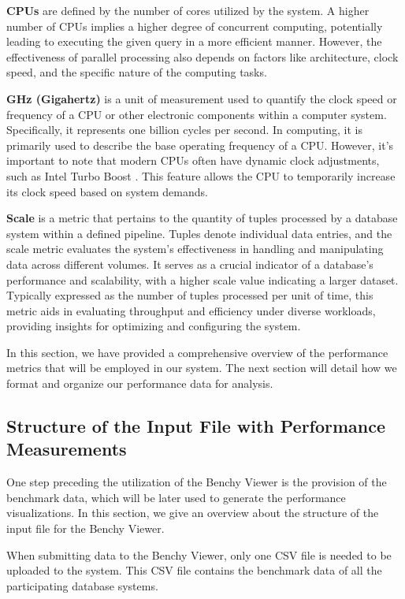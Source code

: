 \textbf{CPUs} are defined by the number of cores utilized by the system. A higher number of CPUs implies a higher degree of concurrent computing, potentially leading to executing the given query in a more efficient manner. However, the effectiveness of parallel processing also depends on factors like architecture, clock speed, and the specific nature of the computing tasks.

\textbf{GHz (Gigahertz)} is a unit of measurement used to quantify the clock speed or frequency of a CPU or other electronic components within a computer system. Specifically, it represents one billion cycles per second. In computing, it is primarily used to describe the base operating frequency of a CPU. However, it's important to note that modern CPUs often have dynamic clock adjustments, such as Intel Turbo Boost \parencite*{intel-turbo-boost}. This feature allows the CPU to temporarily increase its clock speed based on system demands.

\textbf{Scale} is a metric that pertains to the quantity of tuples processed by a database system within a defined pipeline. Tuples denote individual data entries, and the scale metric evaluates the system's effectiveness in handling and manipulating data across different volumes. It serves as a crucial indicator of a database's performance and scalability, with a higher scale value indicating a larger dataset. Typically expressed as the number of tuples processed per unit of time, this metric aids in evaluating throughput and efficiency under diverse workloads, providing insights for optimizing and configuring the system.

In this section, we have provided a comprehensive overview of the performance metrics that will be employed in our system. The next section will detail how we format and organize our performance data for analysis.



\subsection{Structure of the Input File with Performance Measurements}\label{sec:input-file-structure}
One step preceding the utilization of the Benchy Viewer is the provision of the benchmark data, which will be later used to generate the performance visualizations. In this section, we give an overview about the structure of the input file for the Benchy Viewer.

When submitting data to the Benchy Viewer, only one CSV file is needed to be uploaded to the system. This CSV file contains the benchmark data of all the participating database systems.

